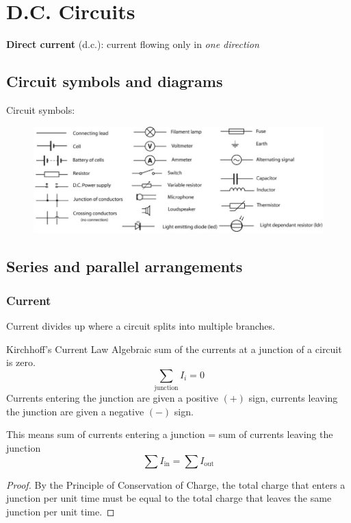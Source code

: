 \section{D.C. Circuits}
\textbf{Direct current} (d.c.): current flowing only in \emph{one direction}

\subsection{Circuit symbols and diagrams}
Circuit symbols:

\begin{figure}[H]
    \includegraphics[width=16cm]{images/circuit_symbols.jpg}
\end{figure}

\subsection{Series and parallel arrangements}
\subsubsection{Current}
Current divides up where a circuit splits into multiple branches. 
\begin{defn}{Kirchhoff’s Current Law}{}
Algebraic sum of the currents at a junction of a circuit is zero.
\begin{equation}
\sum_{\text{junction}}I_i=0
\end{equation}
Currents entering the junction are given a positive $(+)$ sign, currents leaving the junction are given a negative $(-)$ sign.
\end{defn}

This means sum of currents entering a junction = sum of currents leaving the junction
\[ \sum I_\text{in} = \sum I_\text{out} \]

\begin{proof}
By the Principle of Conservation of Charge, the total charge that enters a junction per unit time must be equal to the total charge that leaves the same junction per unit time.
\end{proof}

